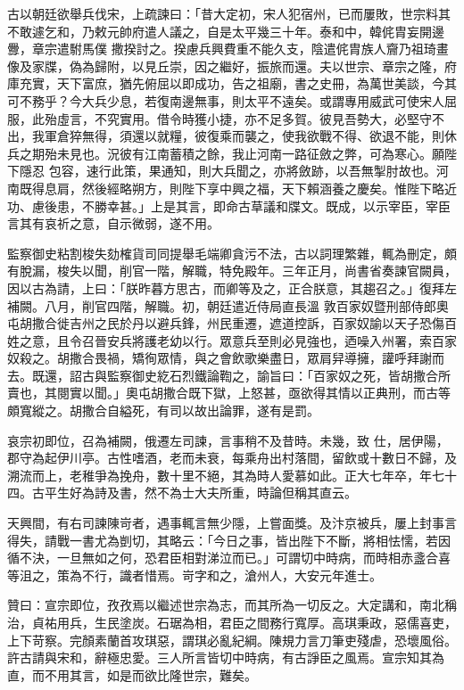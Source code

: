 \begin{pinyinscope}
 古以朝廷欲舉兵伐宋，上疏諫曰：「昔大定初，宋人犯宿州，已而屢敗，世宗料其不敢遽乞和，乃敕元帥府遣人議之，自是太平幾三十年。泰和中，韓侂胄妄開邊釁，章宗遣駙馬僕
 撒揆討之。揆慮兵興費重不能久支，陰遣侂胄族人齎乃祖琦畫像及家牒，偽為歸附，以見丘崇，因之繼好，振旅而還。夫以世宗、章宗之隆，府庫充實，天下富庶，猶先俯屈以即成功，告之祖廟，書之史冊，為萬世美談，今其可不務乎？今大兵少息，若復南邊無事，則太平不遠矣。或謂專用威武可使宋人屈服，此殆虛言，不究實用。借令時獲小捷，亦不足多賀。彼見吾勢大，必堅守不出，我軍倉猝無得，須還以就糧，彼復乘而襲之，使我欲戰不得、欲退不能，則休兵之期殆未見也。況彼有江南蓄積之餘，我止河南一路征斂之弊，可為寒心。願陛下隱忍
 包容，速行此策，果通知，則大兵聞之，亦將斂跡，以吾無掣肘故也。河南既得息肩，然後經略朔方，則陛下享中興之福，天下賴涵養之慶矣。惟陛下略近功、慮後患，不勝幸甚。」上是其言，即命古草議和牒文。既成，以示宰臣，宰臣言其有哀祈之意，自示微弱，遂不用。



 監察御史粘割梭失劾榷貨司同提舉毛端卿貪污不法，古以詞理繁雜，輒為刪定，頗有脫漏，梭失以聞，削官一階，解職，特免殿年。三年正月，尚書省奏諫官闕員，因以古為請，上曰：「朕昨暮方思古，而卿等及之，正合朕意，其趨召之。」復拜左補闕。八月，削官四階，解職。初，朝廷遣近侍局直長溫
 敦百家奴暨刑部侍郎奧屯胡撒合徙吉州之民於丹以避兵鋒，州民重遷，遮道控訴，百家奴諭以天子恐傷百姓之意，且令召晉安兵將護老幼以行。眾意兵至則必見強也，迺噪入州署，索百家奴殺之。胡撒合畏禍，矯徇眾情，與之會飲歌樂盡日，眾肩舁導擁，讙呼拜謝而去。既還，詔古與監察御史紇石烈鐵論鞫之，諭旨曰：「百家奴之死，皆胡撒合所賣也，其閱實以聞。」奧屯胡撒合既下獄，上怒甚，亟欲得其情以正典刑，而古等頗寬縱之。胡撒合自縊死，有司以故出論罪，遂有是罰。



 哀宗初即位，召為補闕，俄遷左司諫，言事稍不及昔時。未幾，致
 仕，居伊陽，郡守為起伊川亭。古性嗜酒，老而未衰，每乘舟出村落間，留飲或十數日不歸，及溯流而上，老稚爭為挽舟，數十里不絕，其為時人愛慕如此。正大七年卒，年七十四。古平生好為詩及書，然不為士大夫所重，時論但稱其直云。



 天興間，有右司諫陳岢者，遇事輒言無少隱，上嘗面獎。及汴京被兵，屢上封事言得失，請戰一書尤為剴切，其略云：「今日之事，皆出陛下不斷，將相怯懦，若因循不決，一旦無如之何，恐君臣相對涕泣而已。」可謂切中時病，而時相赤盞合喜等沮之，策為不行，識者惜焉。岢字和之，滄州人，大安元年進士。



 贊曰：宣宗即位，孜孜焉以繼述世宗為志，而其所為一切反之。大定講和，南北稱治，貞祐用兵，生民塗炭。石琚為相，君臣之間務行寬厚。高琪秉政，惡儒喜吏，上下苛察。完顏素蘭首攻琪惡，謂琪必亂紀綱。陳規力言刀筆吏殘虐，恐壞風俗。許古請與宋和，辭極忠愛。三人所言皆切中時病，有古諍臣之風焉。宣宗知其為直，而不用其言，如是而欲比隆世宗，難矣。



\end{pinyinscope}